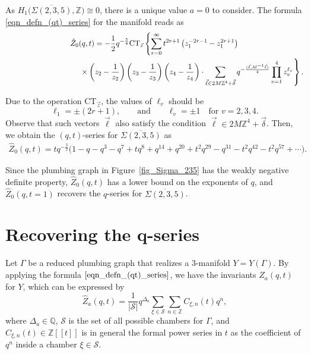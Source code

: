 \documentclass[pdftex]{sigma}
\numberwithin{equation}{section}
\begin{document}
As $ H_1\big(\overline{\Sigma(2,3,5)},\mathbb{Z}\big)\cong 0 $, there is a unique value $ a=0 $ to consider. The formula \eqref{eqn_defn_(qt)_series} for the manifold reads as
\begin{gather*}
		\hat{Z}_0(q,t)=-\frac{1}{2}q^{-\frac{5}{4}} \text{CT}_{\vec{z}}\left\{\sum_{r=0}^{\infty}t^{2r+1}\left(z_1^{-2r-1}-z_1^{2r+1}\right)\right.\\
 \left.
\hphantom{\hat{Z}_0(q,t)=-\frac{1}{2}q^{-\frac{5}{4}} \text{CT}_{\vec{z}}}{}
 \times \left(z_2-\frac{1}{z_2}\right)\left(z_3-\frac{1}{z_3}\right)\left(z_4-\frac{1}{z_4}\right)\cdot\sum_{\vec{\ell}\in 2M\mathbb{Z}^4+\vec{\delta}}q^{-\frac{(\vec{\ell},M^{-1}\vec{\ell})}{4}}\prod_{v=1}^{4}z_v^{\ell_v}\right\}.
	\end{gather*}

Due to the operation $ \text{CT}_{\vec{z}} $, the values of $ \ell_v $ should be
\[
\ell_1=\pm(2r+1), \qquad \text{and} \qquad  \ell_v=\pm1 \quad \text{for } v=2,3,4.
\]
Observe that such vectors $ \vec{\ell} $ also satisfy the condition $ \vec{\ell}\in 2M\mathbb{Z}^4+\vec{\delta} $. Then, we obtain the $ (q,t) $-series for $ \overline{\Sigma(2,3,5)} $ as
\begin{gather}\label{eqn_(q,t)_result_Sigma235}
	\hat{Z}_0(q,t)=tq^{-\frac{3}{2}}\big(1 - {q} - q^{3} - q^{7} + t q^{8} + q^{14} + q^{20} + t^2 q^{29} - q^{31} - t^2 q^{42} - t^2 q^{57}+\cdots\big).\!\!\!
\end{gather}

Since the plumbing graph in Figure~\ref{fig_Sigma_235} has the weakly negative definite property, $ \hat{Z}_0(q,t) $ has a lower bound on the exponents of $ q $, and $ \hat{Z}_0(q,t=1) $ recovers the $ q $-series for $ \overline{\Sigma(2,3,5)} $.

\section[Recovering the q-series]{Recovering the $\boldsymbol{q}$-series}\label{section_recovering_q_series}

Let $ \Gamma $ be a reduced plumbing graph that realizes a 3-manifold $ Y=Y(\Gamma)$. By applying the formula $ \eqref{eqn_defn_(qt)_series} $, we have the invariants $ \hat{Z}_a(q,t) $ for $ Y $, which can be expressed by
\begin{equation*}
	\hat{Z}_a(q,t)=\frac{1}{{|\mathcal{S}|}}q^{\Delta_a}\sum_{\xi \in \mathcal{S}}\sum_{n\in\mathbb{Z}}C_{\xi,n}(t) q^n,
\end{equation*}
where $ \Delta_a\in\mathbb{Q} $, $ \mathcal{S} $ is the set of all possible chambers for $ \Gamma $, and $ C_{\xi,n}(t)\in \mathbb{Z}[[t]] $ is in general the formal power series in $ t $ as the coefficient of $ q^{n} $ inside a chamber $ \xi\in \mathcal{S} $.
\end{document}
